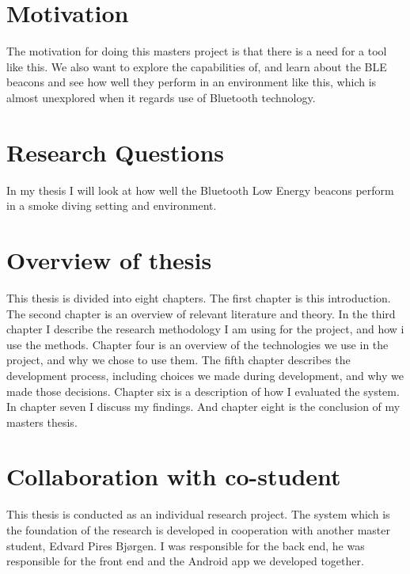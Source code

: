 \documentclass[../Main/thesis.tex]{subfiles}
\begin{document}
\section{Motivation}
The motivation for doing this masters project is that there is a need for a tool like this.
We also want to explore the capabilities of, and learn about the BLE beacons and see how well they perform in an environment like this, which is almost unexplored when it regards use of Bluetooth technology. 


\section{Research Questions}
In my thesis I will look at how well the Bluetooth Low Energy beacons perform in a smoke diving setting and environment. 


\section{Overview of thesis}
This thesis is divided into eight chapters.
The first chapter is this introduction.
The second chapter is an overview of relevant literature and theory.
In the third chapter I describe the research methodology I am using for the project, and how i use the methods.
Chapter four is an overview of the technologies we use in the project, and why we chose to use them.
The fifth chapter describes the development process, including choices we made during development, and why we made those decisions.
Chapter six is a description of how I evaluated the system.
In chapter seven I discuss my findings.
And chapter eight is the conclusion of my masters thesis.

\section{Collaboration with co-student}
This thesis is conducted as an individual research project.
The system which is the foundation of the research is developed in cooperation with another master student, Edvard Pires Bjørgen.
I was responsible for the back end, he was responsible for the front end and the Android app we developed together. 


\onlyinsubfile{}
\onlyinsubfile{}
\end{document}
